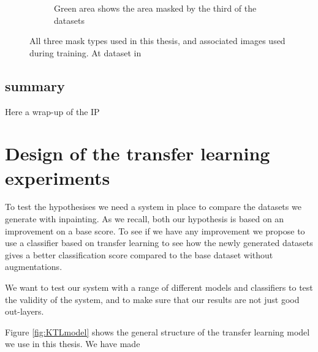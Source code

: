 \begin{figure}[h!]
\begin{subfigure}[t]{0.4\textwidth}
         \caption{Green area shows the area masked by the third of the datasets}
         \label{fig:BothMask}
     \end{subfigure}
     \caption{All three mask types used in this thesis, and associated images used during training. At dataset in}
     \label{fig:masks}
\end{figure}

\subsection{summary}
Here a wrap-up of the IP

\section{Design of the transfer learning experiments}
\label{cha:classifier}
To test the hypothesises we need a system in place to compare the datasets we generate with inpainting. As we recall, both our hypothesis is based on an improvement on a base score. 
To see if we have any improvement we propose to use a classifier based on transfer learning to see how the newly generated datasets gives a better classification score compared to the base dataset without augmentations.

We want to test our system with a range of different models and classifiers to test the validity of the system, and to make sure that our results are not just good out-layers.

Figure \ref{fig:KTLmodel} shows the general structure of the transfer learning model we use in this thesis. We have made  

